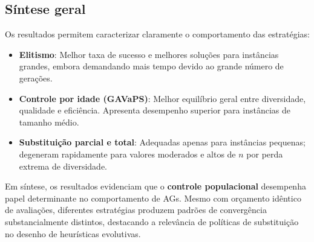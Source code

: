 \subsection{Síntese geral}

Os resultados permitem caracterizar claramente o comportamento das estratégias:

\begin{itemize}
    \item \textbf{Elitismo}:  
    Melhor taxa de sucesso e melhores soluções para instâncias grandes, embora demandando mais tempo devido ao grande número de gerações.

    \item \textbf{Controle por idade (GAVaPS)}:  
    Melhor equilíbrio geral entre diversidade, qualidade e eficiência. Apresenta desempenho superior para instâncias de tamanho médio.

    \item \textbf{Substituição parcial e total}:  
    Adequadas apenas para instâncias pequenas; degeneram rapidamente para valores moderados e altos de $n$ por perda extrema de diversidade.
\end{itemize}

Em síntese, os resultados evidenciam que o \textbf{controle populacional} desempenha papel determinante no comportamento de AGs. Mesmo com orçamento idêntico de avaliações, diferentes estratégias produzem padrões de convergência substancialmente distintos, destacando a relevância de políticas de substituição no desenho de heurísticas evolutivas.
